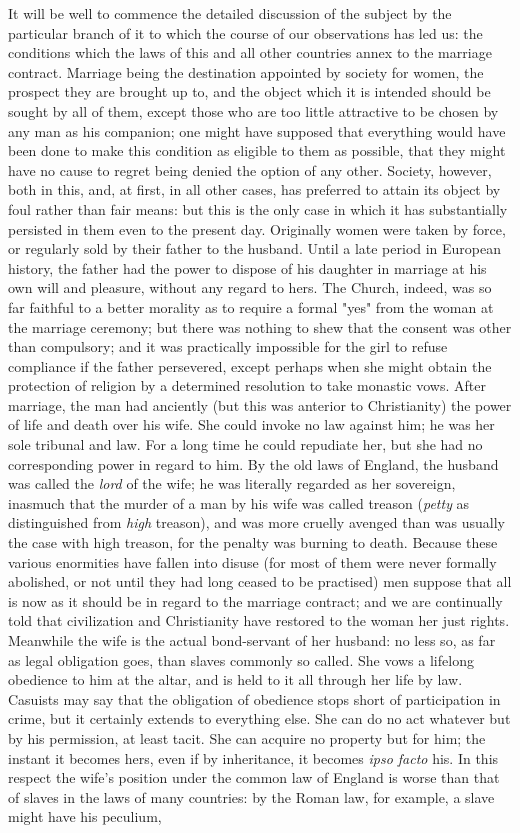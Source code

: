 \documentclass[12pt]{report}
\begin{document}
It will be well to commence the detailed discussion of the subject by the particular branch of it to which the course of our observations has led us: the conditions which the laws of this and all other countries annex to the marriage contract. Marriage being the destination appointed by society for women, the prospect they are brought up to, and the object which it is intended should be sought by all of them, except those who are too little attractive to be chosen by any man as his companion; one might have supposed that everything would have been done to make this condition as eligible to them as possible, that they might have no cause to regret being denied the option of any other. Society, however, both in this, and, at first, in all other cases, has preferred to attain its object by foul rather than fair means: but this is the only case in which it has substantially persisted in them even to the present day. Originally women were taken by force, or regularly sold by their father to the husband. Until a late period in European history, the father had the power to dispose of his daughter in marriage at his own will and pleasure, without any regard to hers. The Church, indeed, was so far faithful to a better morality as to require a formal "yes" from the woman at the marriage ceremony; but there was nothing to shew that the consent was other than compulsory; and it was practically impossible for the girl to refuse compliance if the father persevered, except perhaps when she might obtain the protection of religion by a determined resolution to take monastic vows. After marriage, the man had anciently (but this was anterior to Christianity) the power of life and death over his wife. She could invoke no law against him; he was her sole tribunal and law. For a long time he could repudiate her, but she had no corresponding power in regard to him. By the old laws of England, the husband was called the \emph{lord} of the wife; he was literally regarded as her sovereign, inasmuch that the murder of a man by his wife was called treason (\emph{petty} as distinguished from \emph{high} treason), and was more cruelly avenged than was usually the case with high treason, for the penalty was burning to death. Because these various enormities have fallen into disuse (for most of them were never formally abolished, or not until they had long ceased to be practised) men suppose that all is now as it should be in regard to the marriage contract; and we are continually told that civilization and Christianity have restored to the woman her just rights. Meanwhile the wife is the actual bond-servant of her husband: no less so, as far as legal obligation goes, than slaves commonly so called. She vows a lifelong obedience to him at the altar, and is held to it all through her life by law. Casuists may say that the obligation of obedience stops short of participation in crime, but it certainly extends to everything else. She can do no act whatever but by his permission, at least tacit. She can acquire no property but for him; the instant it becomes hers, even if by inheritance, it becomes \emph{ipso facto} his. In this respect the wife's position under the common law of England is worse than that of slaves in the laws of many countries: by the Roman law, for example, a slave might have his peculium, 
\end{document}
